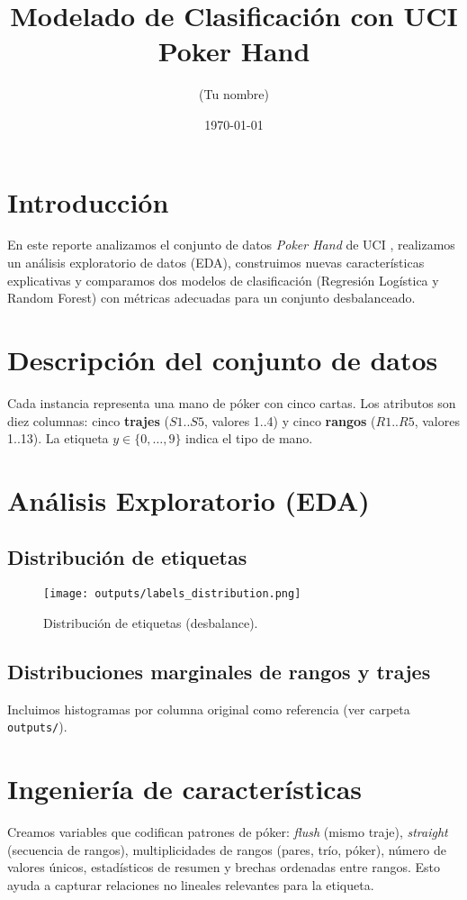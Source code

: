 \documentclass[11pt]{article}
\title{Modelado de Clasificación con UCI Poker Hand}
\author{(Tu nombre)}
\date{\today}
\begin{document}
\maketitle

\section{Introducción}
En este reporte analizamos el conjunto de datos \textit{Poker Hand} de UCI \cite{uci}, realizamos un análisis exploratorio de datos (EDA), construimos nuevas características explicativas y comparamos dos modelos de clasificación (Regresión Logística y Random Forest) con métricas adecuadas para un conjunto desbalanceado.

\section{Descripción del conjunto de datos}
Cada instancia representa una mano de póker con cinco cartas. Los atributos son diez columnas: cinco \textbf{trajes} ($S1..S5$, valores 1..4) y cinco \textbf{rangos} ($R1..R5$, valores 1..13). La etiqueta $y \in \{0,\ldots,9\}$ indica el tipo de mano.

\section{Análisis Exploratorio (EDA)}
\subsection{Distribución de etiquetas}
\begin{figure}[h]
  \centering
  \texttt{[image: outputs/labels\_distribution.png]}
  \caption{Distribución de etiquetas (desbalance).}
\end{figure}

\subsection{Distribuciones marginales de rangos y trajes}
Incluimos histogramas por columna original como referencia (ver carpeta \texttt{outputs/}).

\section{Ingeniería de características}
Creamos variables que codifican patrones de póker: \emph{flush} (mismo traje), \emph{straight} (secuencia de rangos), multiplicidades de rangos (pares, trío, póker), número de valores únicos, estadísticos de resumen y brechas ordenadas entre rangos. Esto ayuda a capturar relaciones no lineales relevantes para la etiqueta.
\end{document}
